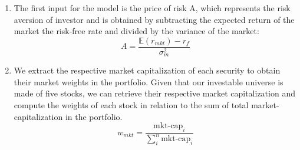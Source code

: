 \begin{enumerate}
\item The first input for the model is the price of risk A, which represents the risk aversion of investor and is obtained by subtracting the expected return of the market the risk-free rate and divided by the variance of the market:
\begin{equation}
  A=\frac{\mathbb{E}(r_{mkt})-r_f}{\sigma_m^2}
\end{equation}

\item We extract the respective market capitalization of each security to obtain their market weights in the portfolio. Given that our investable universe is made of five stocks, we can retrieve their respective market capitalization and compute the weights of each stock in relation to the sum of total market-capitalization in the portfolio.
  \begin{equation}
    w_{mkt} = \frac{\text{mkt-cap}_i}{\sum_i^n\text{mkt-cap}_i}
  \end{equation}



\end{enumerate}
